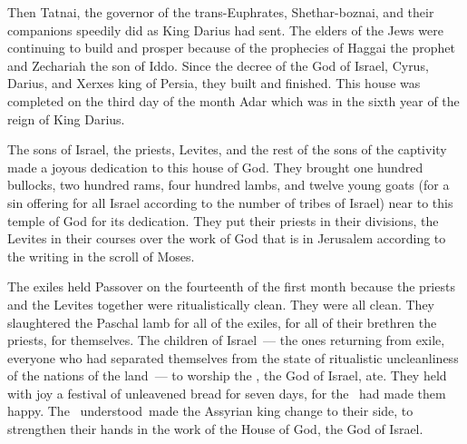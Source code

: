 \begin{inparaenum}\setcounter{enumi}{12}
   Then Tatnai, the governor of the trans-Euphrates, Shethar-boznai, and their companions speedily did as King Darius had sent.%
   The elders of the Jews were continuing to build and prosper because of the prophecies of Haggai the prophet and Zechariah the son of Iddo. Since the decree of the God of Israel, Cyrus, Darius, and Xerxes king of Persia, they built and finished.%
   This house was completed on the third day of the month Adar which was in the sixth year of the reign of King Darius.%
  
   The sons of Israel, the priests, Levites, and the rest of the sons of the captivity made a joyous dedication to this house of God.%
   They brought one hundred bullocks, two hundred rams, four hundred lambs, and twelve young goats (for a sin offering for all Israel according to the number of tribes of Israel) near to this temple of God for its dedication.%
   They put their priests in their divisions, the Levites in their courses over the work of God that is in Jerusalem according to the writing in the scroll of Moses.%
  
   The exiles held Passover on the fourteenth of the first month%
   because the priests and the Levites together were ritualistically clean. They were all clean. They slaughtered the Paschal lamb for all of the exiles, for all of their brethren the priests, for themselves.%
   The children of Israel~--- the ones returning from exile, everyone who had separated themselves from the state of ritualistic uncleanliness of the nations of the land~--- to worship the \lord, the God of Israel, ate.%
   They held with joy a festival of unleavened bread for seven days, for the \lord\ had made them happy. The \lord\ understood\ made the Assyrian king change to their side, to strengthen their hands in the work of the House of God, the God of Israel.%
\end{inparaenum}
